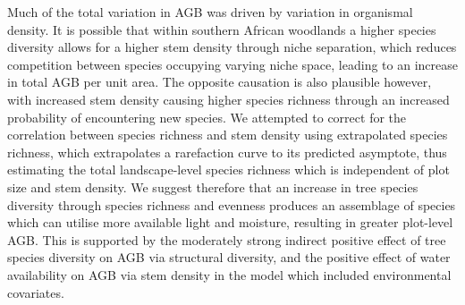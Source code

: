 \documentclass[12pt,a4paper]{article}
\begin{document}
Much of the total variation in AGB was driven by variation in organismal density. It is possible that within southern African woodlands a higher species diversity allows for a higher stem density through niche separation, which reduces competition between species occupying varying niche space, leading to an increase in total AGB per unit area. The opposite causation is also plausible however, with increased stem density causing higher species richness through an increased probability of encountering new species. We attempted to correct for the correlation between species richness and stem density using extrapolated species richness, which extrapolates a rarefaction curve to its predicted asymptote, thus estimating the total landscape-level species richness which is independent of plot size and stem density. We suggest therefore that an increase in tree species diversity through species richness and evenness produces an assemblage of species which can utilise more available light and moisture, resulting in greater plot-level AGB. This is supported by the moderately strong indirect positive effect of tree species diversity on AGB via structural diversity, and the positive effect of water availability on AGB via stem density in the model which included environmental covariates. 
\end{document}
